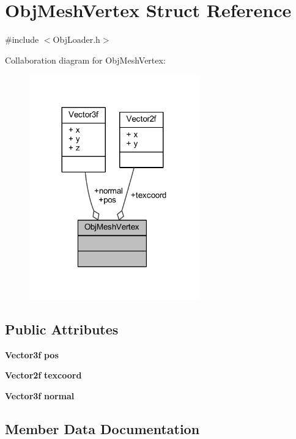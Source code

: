 \section{Obj\+Mesh\+Vertex Struct Reference}
\label{struct_obj_mesh_vertex}


{\ttfamily \#include $<$Obj\+Loader.\+h$>$}



Collaboration diagram for Obj\+Mesh\+Vertex\+:\nopagebreak
\begin{figure}[H]
\begin{center}
\leavevmode
\includegraphics[width=209pt]{d4/d10/struct_obj_mesh_vertex__coll__graph}
\end{center}
\end{figure}
\subsection*{Public Attributes}
\begin{DoxyCompactItemize}
\item 
{\bf Vector3f} {\bf pos}
\item 
{\bf Vector2f} {\bf texcoord}
\item 
{\bf Vector3f} {\bf normal}
\end{DoxyCompactItemize}


\subsection{Member Data Documentation}
